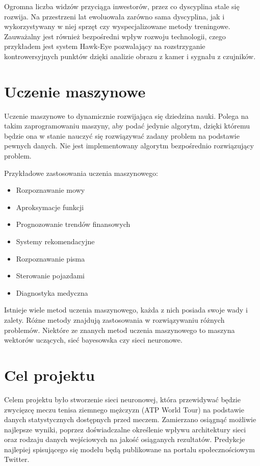 Ogromna liczba widzów przyciąga inwestorów, przez co dyscyplina stale się rozwija. Na przestrzeni lat ewoluowała zarówno sama dyscyplina, jak i wykorzystywany w niej sprzęt czy wyspecjalizowane metody treningowe. Zauważalny jest również bezpośredni wpływ rozwoju technologii, czego przykładem jest system Hawk-Eye pozwalający na rozstrzyganie kontrowersyjnych punktów dzięki analizie obrazu z kamer i sygnału z czujników.



\section{Uczenie maszynowe}
\label{Sec:Machine}
Uczenie maszynowe to dynamicznie rozwijająca się dziedzina nauki. Polega na takim zaprogramowaniu maszyny, aby podać jedynie algorytm, dzięki któremu będzie ona w stanie nauczyć się rozwiązywać zadany problem na podstawie pewnych danych. Nie jest implementowany algorytm bezpośrednio rozwiązujący problem. 

Przykładowe zastosowania uczenia maszynowego:
\begin{itemize}
\item Rozpoznawanie mowy
\item Aproksymacje funkcji
\item Prognozowanie trendów finansowych
\item Systemy rekomendacyjne
\item Rozpoznawanie pisma
\item Sterowanie pojazdami
\item Diagnostyka medyczna
\end{itemize}

Istnieje wiele metod uczenia maszynowego, każda z nich posiada swoje wady i zalety. Różne metody znajdują zastosowania w rozwiązywaniu różnych problemów. Niektóre ze znanych metod uczenia maszynowego to maszyna wektorów uczących, sieć bayesowska czy sieci neuronowe. 

\section{Cel projektu}
\label{Sec:Goal}
Celem projektu było stworzenie sieci neuronowej, która przewidywać będzie zwycięzcę meczu tenisa ziemnego mężczyzn (ATP World Tour) na podstawie danych statystycznych dostępnych przed meczem. Zamierzano osiągnąć możliwie najlepsze wyniki, poprzez doświadczalne określenie wpływu architektury sieci oraz rodzaju danych wejściowych na jakość osiąganych rezultatów. Predykcje najlepiej spisującego się modelu będą publikowane na portalu społecznościowym Twitter.

